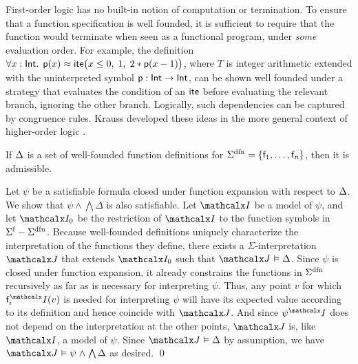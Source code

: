 First-order logic has no built-in notion of computation or termination. To ensure
that a function specification is well founded, it is sufficient to require that
the function would terminate when seen as a functional program, under \emph{some}
evaluation order. For example, the definition
$\forall x : {\mathsf{Int}}.\;\,
\mathsf{p}( x ) \approx \mathsf{ite}\bigl( x \leq 0,\allowbreak\;  1,\allowbreak\;
  2 * \mathsf{p}( x - 1 ) \bigr)$,
where $T$ is integer arithmetic extended with the uninterpreted symbol
$\mathsf{p}:\mathsf{Int} \rightarrow \mathsf{Int}$, can be shown well founded under a strategy that
evaluates the condition of an $\mathsf{ite}$ before evaluating the relevant branch,
ignoring the other branch. Logically, such dependencies can be captured by
congruence rules. Krauss developed these ideas in the more general context of
higher-order logic \cite[Section 2]{krauss-2009-phd}.

\begin{theorem}\label{thm:adm}
If $\DDD$ is a set of well-founded function definitions for\/
$\sfundefs{\Sigma} = \{\con{f}_1,\ldots,\con{f}_n\}$, then it is admissible.
\end{theorem}
\begin{proofsketch}
Let $\psi$ be a satisfiable formula closed under function expansion with
respect to $\DDD$. We show that $\psi \wedge \bigwedge \Delta$ is also
satisfiable. Let $\I$ be a model of $\psi$, and
let $\I_0$ be the restriction of $\I$ to the function symbols in $\sfuns{\Sigma} -
\sfundefs{\Sigma}$. Because well-founded definitions uniquely characterize
the interpretation of the functions they define, there exists a
$\Sigma$-interpretation $\J$ that extends $\I_0$ such that $\J \models \Delta$.
%
Since $\psi$ is closed under function expansion, it already constrains the
functions in $\sfundefs{\Sigma}$ recursively as far as is
necessary for interpreting $\psi$. Thus, any point $v$ for which
$\const{f}_i^\I(v)$ is needed for interpreting $\psi$ will have its
expected value according to its definition and hence coincide with $\J$.
And since $\psi^\I$ does not depend on the interpretation at the other
points, $\J$ is, like $\I$, a model of $\psi$.
Since $\J \models \Delta$ by assumption, we have $\J \models \psi \wedge
\bigwedge \Delta$ as desired.
\qed
\end{proofsketch}


